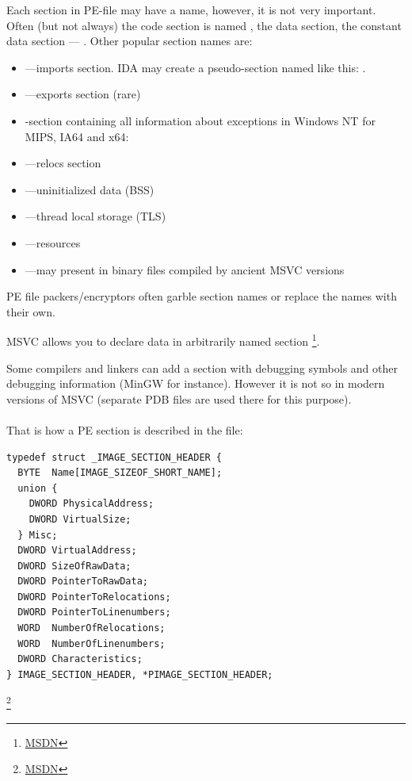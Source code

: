 Each section in PE-file may have a name, however, it is not very important.
Often (but not always) the code section is named , 
the data section\EMDASH{}, the constant data section ---  .
Other popular section names are: 

\begin{itemize}
\item {}---imports section.
\ac{IDA} may create a pseudo-section named like this: .
\item {}---exports section (rare)
\item {}-section containing all information about exceptions in Windows NT for MIPS, \ac{IA64} and x64: 
\item {}---relocs section
\item {}---uninitialized data (\ac{BSS})
\item {}---thread local storage (\ac{TLS})
\item {}---resources
\item {}---may present in binary files compiled by ancient MSVC versions
\end{itemize}

PE file packers/encryptors often garble section names or replace the names with their own.

\ac{MSVC} allows you to declare data in arbitrarily named section
\footnote{\href{http://go.yurichev.com/17047}{MSDN}}.

Some compilers and linkers can add a section with debugging symbols and 
other debugging information (MinGW for instance).
However it is not so in modern versions of \ac{MSVC} (separate \gls{PDB} files are used there for this purpose).\\
\\
That is how a PE section is described in the file:

\begin{lstlisting}
typedef struct _IMAGE_SECTION_HEADER {
  BYTE  Name[IMAGE_SIZEOF_SHORT_NAME];
  union {
    DWORD PhysicalAddress;
    DWORD VirtualSize;
  } Misc;
  DWORD VirtualAddress;
  DWORD SizeOfRawData;
  DWORD PointerToRawData;
  DWORD PointerToRelocations;
  DWORD PointerToLinenumbers;
  WORD  NumberOfRelocations;
  WORD  NumberOfLinenumbers;
  DWORD Characteristics;
} IMAGE_SECTION_HEADER, *PIMAGE_SECTION_HEADER;
\end{lstlisting}
\footnote{\href{http://go.yurichev.com/17048}{MSDN}}

